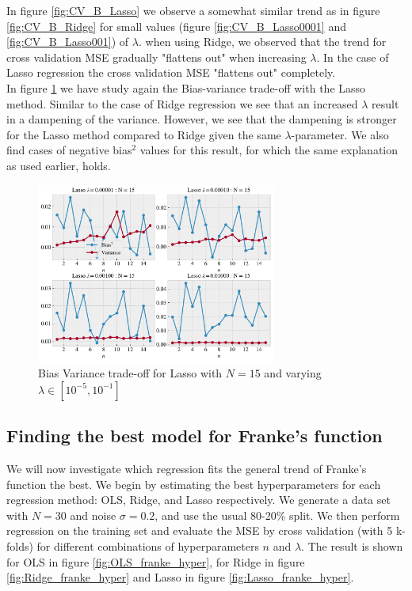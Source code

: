 \documentclass[norsk,a4paper,12pt]{scrartcl}
\begin{document}
In figure \ref{fig:CV_B_Lasso} we observe a somewhat similar trend as in figure \ref{fig:CV_B_Ridge} for small values (figure \ref{fig:CV_B_Lasso0001} and \ref{fig:CV_B_Lasso001}) of $\lambda$. when using Ridge, we observed that the trend for cross validation MSE gradually "flattens out" when increasing $\lambda$. In the case of Lasso regression the cross validation MSE "flattens out" completely.
\\
In figure \ref{fig:B_T_lasso} we have study again the Bias-variance trade-off with the Lasso method.  Similar to the case of Ridge regression we see that an increased $\lambda$ result in a dampening of the variance. However, we see that the dampening is stronger for the Lasso method compared to Ridge given the same $\lambda$-parameter. We also find cases of negative bias$^2$ values for this result, for which the same explanation as used earlier, holds.

\begin{figure}[H]
    \centering
    \includegraphics[width=0.70\textwidth]{figures/bias_variance_tradeoff_Lasso_2x2.pdf}
    \caption{ Bias Variance trade-off for Lasso with $N=15$ and varying $\lambda \in [10^{-5}, 10^{-1}]$}
    \label{fig:B_T_lasso}
\end{figure}



\subsection{Finding the best model for Franke's function}\label{sec:franke_model}
We will now investigate which regression fits the general trend of Franke's function the best. We begin by estimating the best hyperparameters for each regression method: OLS, Ridge, and Lasso respectively. We generate a data set with $N = 30$ and noise $\sigma = 0.2$, and use the usual 80-20\% split. We then perform regression on the training set and evaluate the MSE by cross validation (with 5 k-folds) for different combinations of hyperparameters $n$ and $\lambda$. The result is shown for OLS in figure \ref{fig:OLS_franke_hyper}, for Ridge in figure \ref{fig:Ridge_franke_hyper} and Lasso in figure \ref{fig:Lasso_franke_hyper}.
\end{document}
